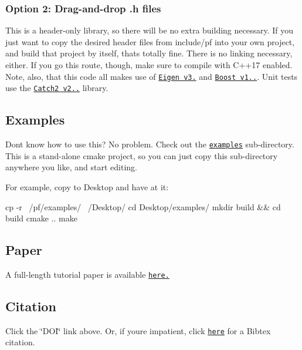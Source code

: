 \subsubsection*{Option 2\+: Drag-\/and-\/drop {\ttfamily .h} files}

This is a header-\/only library, so there will be no extra building necessary. If you just want to copy the desired header files from {\ttfamily include/pf} into your own project, and build that project by itself, that\textquotesingle{}s totally fine. There is no linking necessary, either. If you go this route, though, make sure to compile with C++17 enabled. Note, also, that this code all makes use of \href{http://eigen.tuxfamily.org/}{\tt Eigen v3.} and \href{https://www.boost.org/}{\tt Boost v1..}. Unit tests use the \href{https://github.com/catchorg/Catch2}{\tt Catch2 v2..} library.

\subsection*{Examples}

Don\textquotesingle{}t know how to use this? No problem. Check out the \href{https://github.com/tbrown122387/pf/tree/master/examples}{\tt {\ttfamily examples}} sub-\/directory. This is a stand-\/alone cmake project, so you can just copy this sub-\/directory anywhere you like, and start editing.

For example, copy to {\ttfamily Desktop} and have at it\+: \begin{DoxyVerb}cp -r ~/pf/examples/ ~/Desktop/
cd Desktop/examples/
mkdir build && cd build
cmake ..
make
\end{DoxyVerb}


\subsection*{Paper}

A full-\/length tutorial paper is available \href{https://arxiv.org/abs/2001.10451}{\tt here.}

\subsection*{Citation}

Click the \char`\"{}\+D\+O\+I\char`\"{} link above. Or, if you\textquotesingle{}re impatient, click \href{https://zenodo.org/record/2633289/export/hx}{\tt \textquotesingle{}here\textquotesingle{}} for a Bibtex citation. 